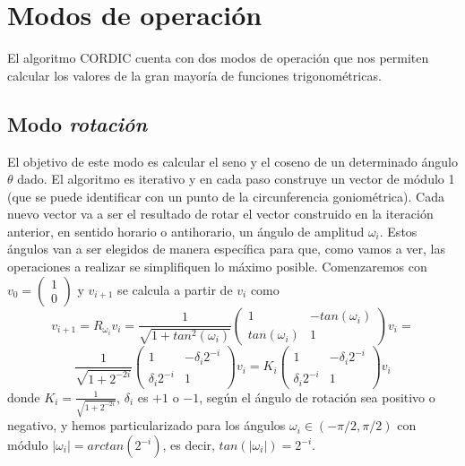 \documentclass[12pt, a4paper]{article}
\providecommand{\abs}[1]{\lvert#1\rvert}
\begin{document}
\section{Modos de operación}
El algoritmo CORDIC cuenta con dos modos de operación que nos permiten calcular los valores de la gran mayoría de funciones trigonométricas.
\subsection{Modo \textit{rotación}}
El objetivo de este modo es calcular el seno y el coseno de un determinado ángulo $\theta$ dado. El algoritmo es iterativo y en cada paso construye un vector de módulo 1 (que se puede identificar con un punto de la circunferencia goniométrica). Cada nuevo vector va a ser el resultado de rotar el vector construido en la iteración anterior, en sentido horario o antihorario, un ángulo de amplitud $\omega_i$. Estos ángulos van a ser elegidos de manera específica para que, como vamos a ver, las operaciones a realizar se simplifiquen lo máximo posible. Comenzaremos con $v_0 =\begin{pmatrix*}
  1\\
  0
 \end{pmatrix*}$ y $v_{i+1}$ se calcula a partir de $v_i$ como
 \[
 v_{i+1}=R_{\omega_i} v_i=
  \frac{1}{\sqrt{1+tan^2(\omega_i)}}
 \begin{pmatrix*}
  1 & -tan(\omega_i)\\
  tan(\omega_i) & 1 
 \end{pmatrix*}v_{i}
 =
  \]
  \[
  \frac{1}{\sqrt{1+2^{-2i}}}
   \begin{pmatrix*}
  1 & -\delta_i2^{-i}\\
  \delta_i2^{-i} & 1 
 \end{pmatrix*}v_{i}
=
 K_i\begin{pmatrix*}
  1 & -\delta_i2^{-i}\\
  \delta_i2^{-i} & 1 
 \end{pmatrix*}v_{i}
 \]
 donde $K_i=\frac{1}{\sqrt{1+2^{-2i}}}$, $\delta_i$ es $+1$ o $-1$, según el ángulo de rotación sea positivo o negativo, y hemos particularizado para los ángulos $\omega_i\in(-\pi/2,\pi/2)$ con módulo $\abs{\omega_i}=arctan(2^{-i})$, es decir, $tan(\abs{\omega_i})=2^{-i}$.
 
\end{document}
